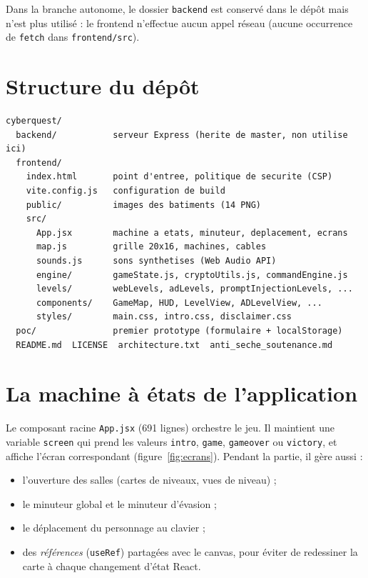 \documentclass[11pt,a4paper]{report}
\newcommand{\file}[1]{\texttt{\nolinkurl{#1}}}
\begin{document}
Dans la branche autonome, le dossier \file{backend} est conserv\'e dans le d\'ep\^ot mais
n'est plus utilis\'e : le frontend n'effectue aucun appel r\'eseau (aucune occurrence de
\texttt{fetch} dans \file{frontend/src}).

\section{Structure du d\'ep\^ot}

\begin{lstlisting}[style=plain,caption={Arborescence simplifi\'ee de la branche \texttt{proof-of-concept}}]
cyberquest/
  backend/           serveur Express (herite de master, non utilise ici)
  frontend/
    index.html       point d'entree, politique de securite (CSP)
    vite.config.js   configuration de build
    public/          images des batiments (14 PNG)
    src/
      App.jsx        machine a etats, minuteur, deplacement, ecrans
      map.js         grille 20x16, machines, cables
      sounds.js      sons synthetises (Web Audio API)
      engine/        gameState.js, cryptoUtils.js, commandEngine.js
      levels/        webLevels, adLevels, promptInjectionLevels, ...
      components/    GameMap, HUD, LevelView, ADLevelView, ...
      styles/        main.css, intro.css, disclaimer.css
  poc/               premier prototype (formulaire + localStorage)
  README.md  LICENSE  architecture.txt  anti_seche_soutenance.md
\end{lstlisting}

\section{La machine \`a \'etats de l'application}

Le composant racine \file{App.jsx} (691 lignes) orchestre le jeu. Il maintient une
variable \texttt{screen} qui prend les valeurs \texttt{intro}, \texttt{game},
\texttt{gameover} ou \texttt{victory}, et affiche l'\'ecran correspondant
(figure~\ref{fig:ecrans}). Pendant la partie, il g\`ere aussi :

\begin{itemize}
  \item l'ouverture des salles (cartes de niveaux, vues de niveau) ;
  \item le minuteur global et le minuteur d'\'evasion ;
  \item le d\'eplacement du personnage au clavier ;
  \item des \emph{r\'ef\'erences} (\texttt{useRef}) partag\'ees avec le canvas, pour
        \'eviter de redessiner la carte \`a chaque changement d'\'etat React.
\end{itemize}
\end{document}
